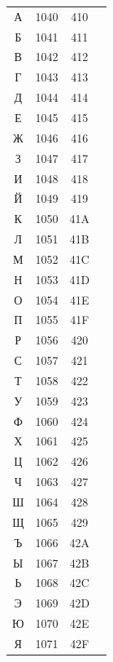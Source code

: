 ﻿\documentclass[10pt]{article}
\begin{document}
\begin{tabular}{crcl}
А&1040&410&\\
Б&1041&411&\\
В&1042&412&\\
Г&1043&413&\\
Д&1044&414&\\
Е&1045&415&\\
Ж&1046&416&\\
З&1047&417&\\
И&1048&418&\\
Й&1049&419&\\
К&1050&41A&\\
Л&1051&41B&\\
М&1052&41C&\\
Н&1053&41D&\\
О&1054&41E&\\
П&1055&41F&\\
Р&1056&420&\\
С&1057&421&\\
Т&1058&422&\\
У&1059&423&\\
Ф&1060&424&\\
Х&1061&425&\\
Ц&1062&426&\\
Ч&1063&427&\\
Ш&1064&428&\\
Щ&1065&429&\\
Ъ&1066&42A&\\
Ы&1067&42B&\\
Ь&1068&42C&\\
Э&1069&42D&\\
Ю&1070&42E&\\
Я&1071&42F&\\
\end{tabular}
\end{document}
